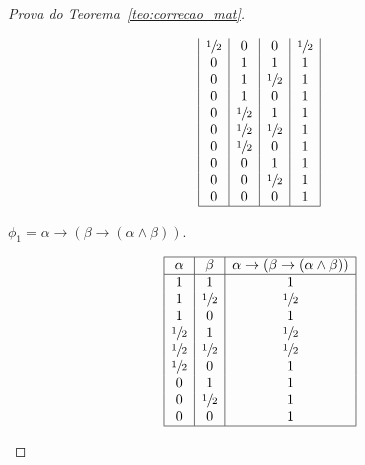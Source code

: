 \begin{proof}[Prova do Teorema~\ref{teo:correcao_mat}]
\begin{provaporcasos}
\begin{provaporsubcasos}
\begin{center}
\[\begin{array}{|c|c|c|c|}
                                \sfrac{1}{2}{} & 0           & 0           & \sfrac{1}{2}{} \\
                                0           & 1           & 1           & 1 \\
                                0           & 1           & \sfrac{1}{2}{} & 1 \\
                                0           & 1           & 0           & 1 \\
                                0           & \sfrac{1}{2}{} & 1           & 1 \\
                                0           & \sfrac{1}{2}{} & \sfrac{1}{2}{} & 1 \\
                                0           & \sfrac{1}{2}{} & 0           & 1 \\
                                0           & 0           & 1           & 1 \\
                                0           & 0           & \sfrac{1}{2}{} & 1 \\
                                0           & 0           & 0           & 1 \\
                                \hline
                            \end{array}
                        \]
                    \end{center}
                

                \subcasodeprova{} $\phi_{1} = \alpha \to (\beta \to (\alpha \land \beta))$. 

                \begin{center}
                    \[
                        \begin{array}{|c|c|c|}%
                            \hline
                            \alpha      & \beta & \alpha \to (\beta \to (\alpha \land \beta)) \\
                            \hline%
                            1&1&               1\\ 
                            1&\meio{}&\meio{}\\
                            1&0&1\\
                            \meio{}&1&\meio{}\\
                            \meio{}&\meio{}&\meio{}\\
                            \meio{}&0&1\\
                            0&1&1\\
                            0&\meio{}&1\\
                            0&0&1\\
                            \hline
                        \end{array}
                    \]
                \end{center}


\end{provaporsubcasos}
\end{provaporcasos}
\end{proof}
